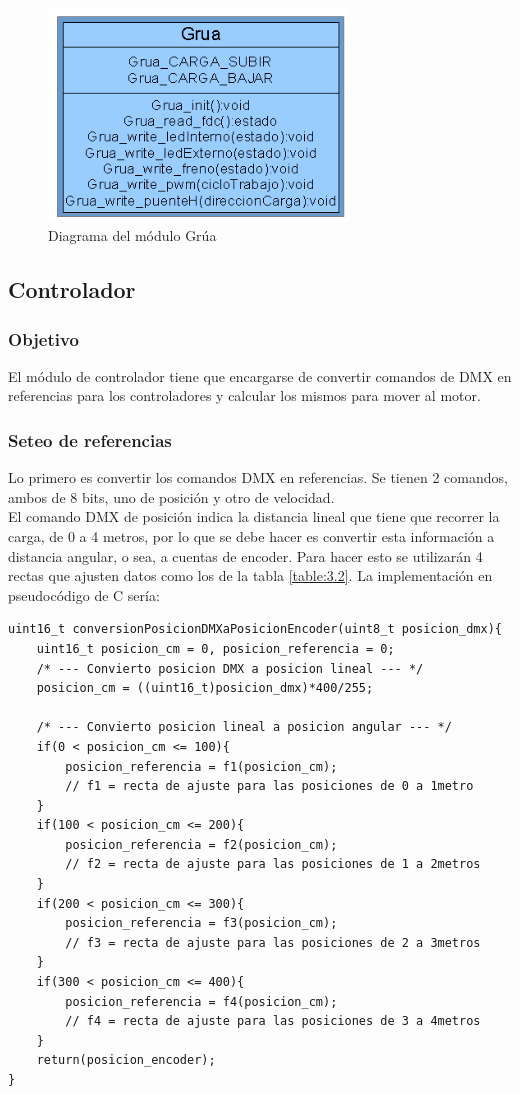 \begin{figure}[!ht]
	\centering
	\includegraphics[width=8cm,scale=1]{resources/3_26-moduloGrua.png}
	\caption{Diagrama del módulo Grúa}
	\label{fig:\thefigure}
\end{figure}

\newpage
\subsection{Controlador}
\subsubsection{Objetivo}
El módulo de controlador tiene que encargarse de convertir comandos de DMX en referencias para los controladores y calcular los mismos para mover al motor.

\subsubsection{Seteo de referencias}
Lo primero es convertir los comandos DMX en referencias. Se tienen 2 comandos, ambos de 8 bits, uno de posición y otro de velocidad.\\
El comando DMX de posición indica la distancia lineal que tiene que recorrer la carga, de 0 a 4 metros, por lo que se debe hacer es convertir esta información a distancia angular, o sea, a cuentas de encoder. Para hacer esto se utilizarán 4 rectas que ajusten datos como los de la tabla \ref{table:3.2}. La implementación en pseudocódigo de C sería:
\begin{lstlisting}[style=CStyle]
uint16_t conversionPosicionDMXaPosicionEncoder(uint8_t posicion_dmx){
	uint16_t posicion_cm = 0, posicion_referencia = 0;
	/* --- Convierto posicion DMX a posicion lineal --- */
	posicion_cm = ((uint16_t)posicion_dmx)*400/255;
	
	/* --- Convierto posicion lineal a posicion angular --- */
	if(0 < posicion_cm <= 100){
		posicion_referencia = f1(posicion_cm); 
		// f1 = recta de ajuste para las posiciones de 0 a 1metro
	}
	if(100 < posicion_cm <= 200){
		posicion_referencia = f2(posicion_cm); 
		// f2 = recta de ajuste para las posiciones de 1 a 2metros
	}
	if(200 < posicion_cm <= 300){
		posicion_referencia = f3(posicion_cm); 
		// f3 = recta de ajuste para las posiciones de 2 a 3metros
	}
	if(300 < posicion_cm <= 400){
		posicion_referencia = f4(posicion_cm); 
		// f4 = recta de ajuste para las posiciones de 3 a 4metros
	}
	return(posicion_encoder);
}
\end{lstlisting}

